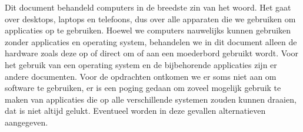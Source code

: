 Dit document behandeld computers in de breedste zin van het woord. Het gaat over desktops, laptops en telefoons, dus over alle apparaten die we gebruiken om applicaties op te gebruiken. Hoewel we computers nauwelijks kunnen gebruiken zonder applicaties en operating system, behandelen we in dit document alleen de hardware zoals deze op of direct om of aan een moederbord gebruikt wordt. Voor het gebruik van een operating system en de bijbehorende applicaties zijn er andere documenten. Voor de opdrachten ontkomen we er soms niet aan om software te gebruiken, er is een poging gedaan om zoveel mogelijk gebruik te maken van applicaties die op alle verschillende systemen zouden kunnen draaien, dat is niet altijd gelukt. Eventueel worden in deze gevallen alternatieven aangegeven.
